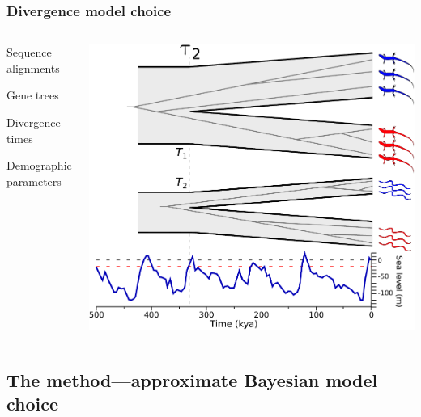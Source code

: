 \begin{frame}
    \frametitle{Divergence model choice}
    \begin{columns}[c]
            \begin{mydescription}
                \item<2->[\alignmentVector] Sequence alignments
                \item<2->[\geneTreeVector] Gene trees
                \item<2->[\divTimeMapVector] Divergence times
                \item<2->[\demographicParamVector] Demographic parameters
            \end{mydescription}
            \includegraphics[width=\textwidth]{images/sea-level-species-trees-gene-trees.pdf}
    \end{columns}
\end{frame}

\subsection{The method---approximate Bayesian model choice}


